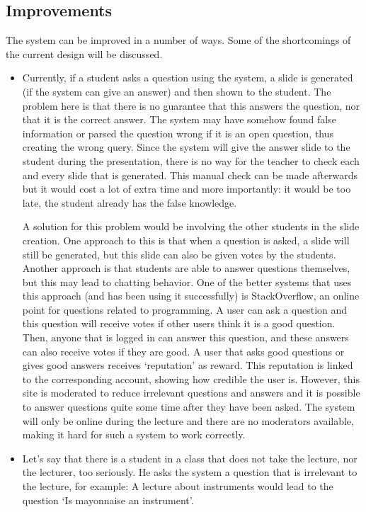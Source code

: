 \documentclass[11pt]{article}
\begin{document}
\subsection{Improvements}
The system can be improved in a number of ways. Some of the shortcomings of the current design will be discussed. 
\begin{itemize}
\item Currently, if a student asks a question using the system, a slide is generated (if the system can give an answer) and then shown to the student. The problem here is that there is no guarantee that this answers the question, nor that it is the correct answer. The system may have somehow found false information or parsed the question wrong if it is an open question, thus creating the wrong query. Since the system will give the answer slide to the student during the presentation, there is no way for the teacher to check each and every slide that is generated. This manual check can be made afterwards but it would cost a lot of extra time and more importantly: it would be too late, the student already has the false knowledge. 

A solution for this problem would be involving the other students in the slide creation. One approach to this is that when a question is asked, a slide will still be generated, but this slide can also be given votes by the students. Another approach is that students are able to answer questions themselves, but this may lead to chatting behavior. One of the better systems that uses this approach (and has been using it successfully) is StackOverflow, an online point for questions related to programming. A user can ask a question and this question will receive votes if other users think it is a good question. Then, anyone that is logged in can answer this question, and these answers can also receive votes if they are good. A user that asks good questions or gives good answers receives `reputation' as reward. This reputation is linked to the corresponding account, showing how credible the user is. However, this site is moderated to reduce irrelevant questions and answers and it is possible to answer questions quite some time after they have been asked. The system will only be online during the lecture and there are no moderators available, making it hard for such a system to work correctly. 

\item Let's say that there is a student in a class that does not take the lecture, nor the lecturer, too seriously. He asks the system a question that is irrelevant to the lecture, for example: A lecture about instruments would lead to the question ‘Is mayonnaise an instrument'. 
\end{itemize}
\end{document}
